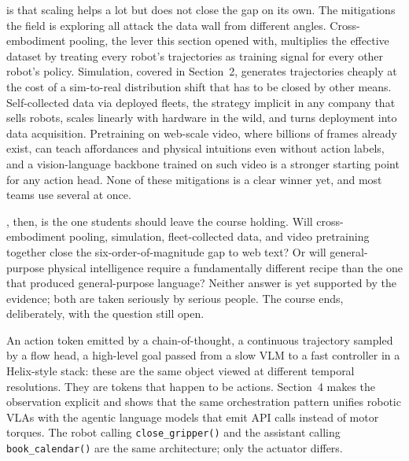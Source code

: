  is that scaling helps a lot but does not close the gap on its own. The mitigations the field is exploring all attack the data wall from different angles. Cross-embodiment pooling, the lever this section opened with, multiplies the effective dataset by treating every robot's trajectories as training signal for every other robot's policy. Simulation, covered in Section~2, generates trajectories cheaply at the cost of a sim-to-real distribution shift that has to be closed by other means. Self-collected data via deployed fleets, the strategy implicit in any company that sells robots, scales linearly with hardware in the wild, and turns deployment into data acquisition. Pretraining on web-scale video, where billions of frames already exist, can teach affordances and physical intuitions even without action labels, and a vision-language backbone trained on such video is a stronger starting point for any action head. None of these mitigations is a clear winner yet, and most teams use several at once.


, then, is the one students should leave the course holding. Will cross-embodiment pooling, simulation, fleet-collected data, and video pretraining together close the six-order-of-magnitude gap to web text? Or will general-purpose physical intelligence require a fundamentally different recipe than the one that produced general-purpose language? Neither answer is yet supported by the evidence; both are taken seriously by serious people. The course ends, deliberately, with the question still open.

\vspace{2.5em}

 An action token emitted by a chain-of-thought, a continuous trajectory sampled by a flow head, a high-level goal passed from a slow VLM to a fast controller in a Helix-style stack: these are the same object viewed at different temporal resolutions. They are tokens that happen to be actions. Section~4 makes the observation explicit and shows that the same orchestration pattern unifies robotic VLAs with the agentic language models that emit API calls instead of motor torques. The robot calling \texttt{close\_gripper()} and the assistant calling \texttt{book\_calendar()} are the same architecture; only the actuator differs.


